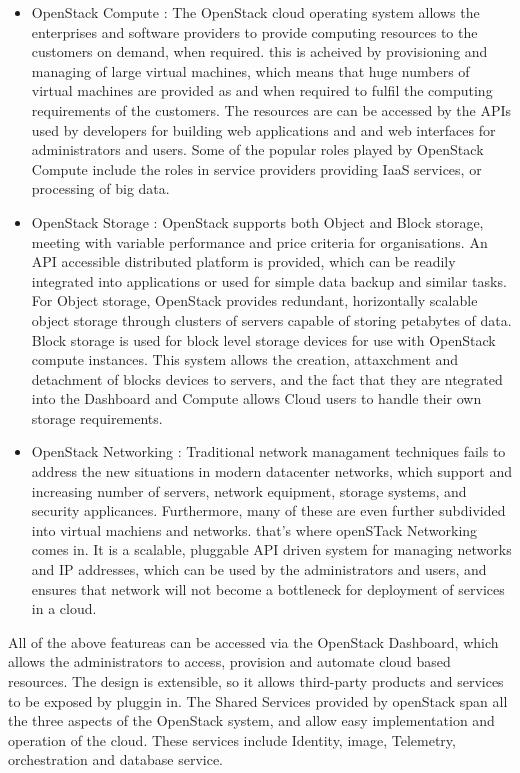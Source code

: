 \documentclass[14pt]{article}
\begin{document}
\begin{itemize}

\item OpenStack Compute \cite{OpenstackCompute} : The OpenStack cloud operating system allows the enterprises and software providers to provide computing resources to the customers on demand, when required. this is acheived by provisioning and managing of large virtual machines, which means that huge numbers of virtual machines are provided as and when required to fulfil the computing requirements of the customers. The resources are can be accessed by the APIs used by developers for building web applications and and web interfaces for administrators and users. Some of the popular roles played by OpenStack Compute include the roles in service providers providing IaaS services, or processing of big data.

\item OpenStack Storage \cite{OpenstackStorage} : OpenStack supports both Object and Block storage, meeting with variable performance and price criteria for organisations. An API accessible distributed platform is provided, which can be readily integrated into applications or used for simple data backup and similar tasks. For Object storage, OpenStack provides redundant, horizontally scalable object storage through clusters of servers capable of storing petabytes of data. Block storage is used for block level storage devices for use with OpenStack compute instances. This system allows the creation, attaxchment and detachment of blocks devices to servers, and the fact that they are ntegrated into the Dashboard and Compute allows Cloud users to handle their own storage requirements.

\item OpenStack Networking \cite{OpenstackNW} : Traditional network managament techniques fails to address the new situations in modern datacenter networks, which support and increasing number of servers, network equipment, storage systems, and security applicances. Furthermore, many of these are even further subdivided into virtual machiens and networks. that's where openSTack Networking comes in. It is a scalable, pluggable API driven system for managing networks and IP addresses, which can be used by the administrators and users, and ensures that network will not become a bottleneck for deployment of services in a cloud.

\end{itemize}

All of the above featureas can be accessed via the OpenStack Dashboard, which allows the administrators to access, provision and automate cloud based resources. The design is extensible, so it allows third-party products and services to be exposed by pluggin in. The Shared Services provided by openStack span all the three aspects of the OpenStack system, and allow easy implementation and operation of the cloud. These services include Identity, image, Telemetry, orchestration and database service.
\end{document}
